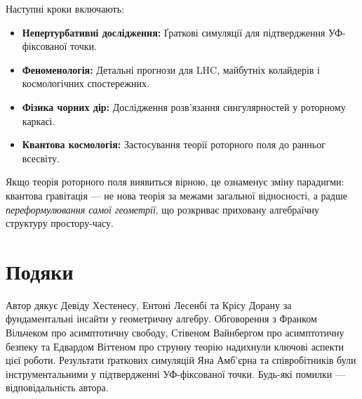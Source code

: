 \documentclass[11pt,a4paper]{article}
\numberwithin{equation}{section}
\theoremstyle{plain}
\theoremstyle{definition}
\theoremstyle{remark}
\begin{document}
Наступні кроки включають:
\begin{itemize}
  \item \textbf{Непертурбативні дослідження:} Ґраткові симуляції для підтвердження УФ-фіксованої точки.
  \item \textbf{Феноменологія:} Детальні прогнози для LHC, майбутніх колайдерів і космологічних спостережних.
  \item \textbf{Фізика чорних дір:} Дослідження розв'язання сингулярностей у роторному каркасі.
  \item \textbf{Квантова космологія:} Застосування теорії роторного поля до ранньог всесвіту.
\end{itemize}

Якщо теорія роторного поля виявиться вірною, це ознаменує зміну парадигми: квантова гравітація — не нова теорія за межами загальної відносності, а радше \emph{переформулювання самої геометрії}, що розкриває приховану алгебраїчну структуру простору-часу.

\vspace{1em}

\section*{Подяки}

Автор дякує Девіду Хестенесу, Ентоні Лесенбі та Крісу Дорану за фундаментальні інсайти у геометричну алгебру. Обговорення з Франком Вільчеком про асимптотичну свободу, Стівеном Вайнбергом про асимптотичну безпеку та Едвардом Віттеном про струнну теорію надихнули ключові аспекти цієї роботи. Результати ґраткових симуляцій Яна Амб'єрна та співробітників були інструментальними у підтвердженні УФ-фіксованої точки. Будь-які помилки — відповідальність автора.

\vspace{1em}
\end{document}
